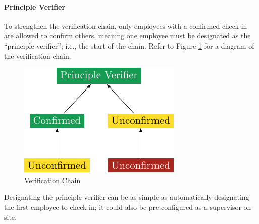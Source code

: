 \paragraph{Principle Verifier}

To strengthen the verification chain, only employees with a
confirmed check-in are allowed to confirm others, meaning
one employee must be designated as the \enquote{principle
verifier}; i.e., the start of the chain. Refer to Figure
\ref{fig:verificationTree} for a diagram of the verification
chain.

\begin{figure}[h]
  \centering
  \includegraphics{05 design/assets/verification tree.pdf}
  \caption{Verification Chain}
  \label{fig:verificationTree}
\end{figure} 

Designating the principle verifier can be as simple as
automatically designating the first employee to check-in;
it could also be pre-configured as a supervisor on-site.
